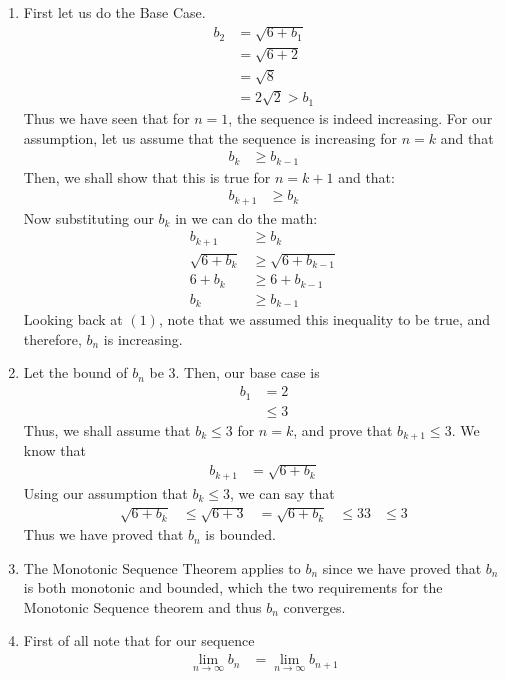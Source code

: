 \documentclass{article}
\begin{document}
\begin{enumerate}[label=\textbf{(9.\arabic*)}]
\begin{enumerate}
\item First let us do the Base Case.
\begin{align*}
b_2 &= \sqrt{6+b_1}\\
&= \sqrt{6+2}\\
&= \sqrt{8}\\
&= 2\sqrt{2}>b_1
\end{align*}
Thus we have seen that for $n=1$, the sequence is indeed increasing. For our assumption, let us assume that the sequence is increasing for $n=k$ and that 
\begin{align}
b_{k} &\ge b_{k-1}
\end{align}
Then, we shall show that this is true for $n=k+1$ and that:
\begin{align*}
b_{k+1} &\ge b_k
\end{align*}
Now substituting our $b_k$ in we can do the math:
\begin{align*}
b_{k+1} &\ge b_k\\
\sqrt{6+b_k} &\ge \sqrt{6+b_{k-1}}\\
6+b_k &\ge 6+b_{k-1}\\
b_{k} &\ge b_{k-1}
\end{align*}
Looking back at $(1)$, note that we assumed this inequality to be true, and therefore, $b_n$ is increasing.
\item Let the bound of $b_n$ be 3. Then, our base case is
\begin{align*}
b_1 &= 2\\
&\le 3
\end{align*}
Thus, we shall assume that $b_k\le3$ for $n=k$, and prove that $b_{k+1}\le3$. We know that 
\begin{align*}
b_{k+1} &= \sqrt{6+b_k}
\end{align*}
Using our assumption that $b_k\le3$, we can say that 
\begin{align*}
\sqrt{6+b_k} &\le \sqrt{6+3}
&=\sqrt{6+b_k} &\le 3
3 &\le3
\end{align*}
Thus we have proved that $b_n$ is bounded.
\item The Monotonic Sequence Theorem applies to $b_n$ since we have proved that $b_n$ is both monotonic and bounded, which the two requirements for the Monotonic Sequence theorem and thus $b_n$ converges.
\item First of all note that for our sequence
\begin{align}
\lim_{n\to\infty} b_n &= \lim_{n\to\infty} b_{n+1}
\end{align}

\end{enumerate}
\end{enumerate}
\end{document}
